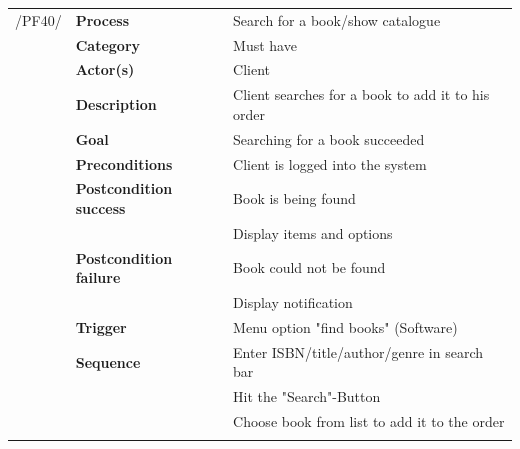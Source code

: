 \documentclass[11pt,a4paper,oneside,svgnames]{report}
\begin{document}
\noindent
\begin{tabular}{p{1.5cm}p{3cm}p{8cm}}
\cellcolor{white}	 /PF40/	& \textbf{Process} & Search for a book/show catalogue\\ 
\cellcolor{white}		& \textbf{Category} & Must have\\
\cellcolor{white}		& \textbf{Actor(s)} & Client\\ 
\cellcolor{white}		& \textbf{Description}	 & Client searches for a book to add it to his order\\ 
\cellcolor{white}		& \textbf{Goal} & Searching for a book succeeded\\
\cellcolor{white}		& \textbf{Preconditions} & Client is logged into the system\\
\cellcolor{white}		& \textbf{Postcondition success} & Book is being found\\
\cellcolor{white}		& & Display items and options\\
\cellcolor{white}		& \textbf{Postcondition failure} & Book could not be found\\
\cellcolor{white}		& & Display notification\\
\cellcolor{white}		& \textbf{Trigger} & Menu option "find books" (Software)\\
\cellcolor{white}		& \textbf{Sequence} & Enter ISBN/title/author/genre in search bar\\
\cellcolor{white}		& & Hit the "Search"-Button\\
\cellcolor{white}		& & Choose book from list to add it to the order\\
\cellcolor{white}\hfill \\
\end{tabular}
\end{document}
